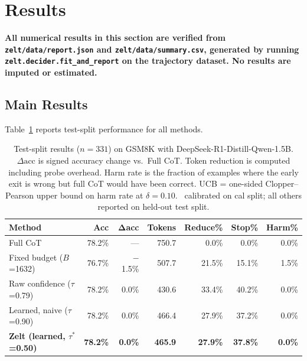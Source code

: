 \documentclass[11pt]{article}
\begin{document}
\section{Results}
\label{sec:results}

\textbf{All numerical results in this section are verified from
\texttt{zelt/data/report.json} and \texttt{zelt/data/summary.csv},
generated by running \texttt{zelt.decider.fit\_and\_report} on
the trajectory dataset. No results are imputed or estimated.}

\subsection{Main Results}

Table~\ref{tab:main} reports test-split performance for all methods.

\begin{table}[t]
\centering
\caption{
  Test-split results ($n=331$) on GSM8K with DeepSeek-R1-Distill-Qwen-1.5B.
  $\Delta\mathrm{acc}$ is signed accuracy change vs.\ Full CoT.
  Token reduction is computed including probe overhead.
  Harm rate is the fraction of examples where the early exit is wrong
  but full CoT would have been correct.
  UCB = one-sided Clopper--Pearson upper bound on harm rate at $\delta=0.10$.
  \textdagger{}\ calibrated on cal split; all others reported on held-out test split.
}
\label{tab:main}
\small
\begin{tabular}{lrrrrrr}
\toprule
\textbf{Method} & \textbf{Acc} & $\boldsymbol{\Delta}$\textbf{acc} &
\textbf{Tokens} & \textbf{Reduce\%} & \textbf{Stop\%} & \textbf{Harm\%} \\
\midrule
Full CoT            & 78.2\% & ---  & 750.7 & 0.0\%  & 0.0\%  & 0.0\%  \\
Fixed budget ($B$=1632) & 76.7\% & $-$1.5\% & 507.7 & 21.5\% & 15.1\%  & 1.5\%  \\
Raw confidence ($\tau$=0.79) & 78.2\% & 0.0\% & 430.6 & 33.4\% & 40.2\% & 0.0\%  \\
Learned, naive ($\tau$=0.90) & 78.2\% & 0.0\% & 466.4 & 27.9\% & 37.2\% & 0.0\%  \\
\textbf{Zelt (learned, $\tau^*$=0.50)} & \textbf{78.2\%} & \textbf{0.0\%} & \textbf{465.9} & \textbf{27.9\%} & \textbf{37.8\%} & \textbf{0.0\%} \\
\bottomrule
\end{tabular}
\end{table}
\end{document}
